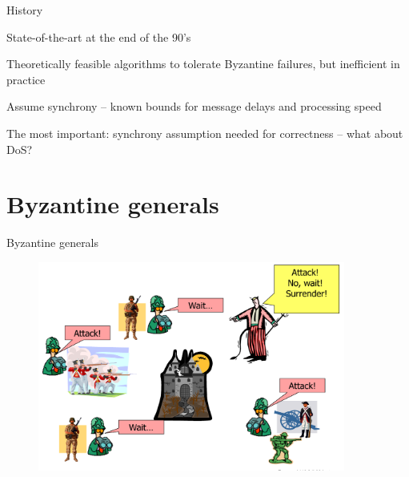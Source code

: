 \begin{frame}{History}

\BIL
\item State-of-the-art at the end of the 90's
\BI
\item Theoretically feasible algorithms to tolerate Byzantine failures, but inefficient in practice
\item Assume synchrony – known bounds for message delays and processing speed
\item The most important: synchrony assumption needed for correctness – what about DoS?
\EI
\EIL

\bigskip
\begin{Bib}
\end{Bib}

\end{frame}

\section{Byzantine generals}

\begin{frame}{Byzantine generals}
	
\begin{figure}
	\includegraphics[width=0.9\textwidth]{figs/16/generals.pdf}
\end{figure}

\end{frame}


